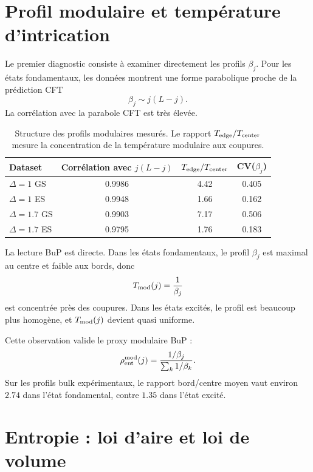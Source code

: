 \documentclass[11pt,a4paper]{article}
\begin{document}
\section{Profil modulaire et température d'intrication}

Le premier diagnostic consiste à examiner directement les profils $\beta_j$. Pour les états fondamentaux, les données montrent une forme parabolique proche de la prédiction CFT
\[
\beta_j\sim j(L-j).
\]
La corrélation avec la parabole CFT est très élevée.

\begin{table}[h]
\centering
\begin{tabular}{lccc}
\toprule
Dataset & Corrélation avec $j(L-j)$ & $T_{\rm edge}/T_{\rm center}$ & CV($\beta_j$) \\
\midrule
$\Delta=1$ GS & 0.9986 & 4.42 & 0.405 \\
$\Delta=1$ ES & 0.9948 & 1.66 & 0.162 \\
$\Delta=1.7$ GS & 0.9903 & 7.17 & 0.506 \\
$\Delta=1.7$ ES & 0.9795 & 1.76 & 0.183 \\
\bottomrule
\end{tabular}
\caption{Structure des profils modulaires mesurés. Le rapport $T_{\rm edge}/T_{\rm center}$ mesure la concentration de la température modulaire aux coupures.}
\label{tab:beta_profiles}
\end{table}

La lecture BuP est directe. Dans les états fondamentaux, le profil $\beta_j$ est maximal au centre et faible aux bords, donc
\[
T_{\rm mod}(j)=\frac{1}{\beta_j}
\]
est concentrée près des coupures. Dans les états excités, le profil est beaucoup plus homogène, et $T_{\rm mod}(j)$ devient quasi uniforme.

Cette observation valide le proxy modulaire BuP :
\[
\rho_{\rm ent}^{\rm mod}(j)
=
\frac{1/\beta_j}{\sum_k1/\beta_k}.
\]
Sur les profils bulk expérimentaux, le rapport bord/centre moyen vaut environ $2.74$ dans l'état fondamental, contre $1.35$ dans l'état excité.

\section{Entropie : loi d'aire et loi de volume}
\end{document}
